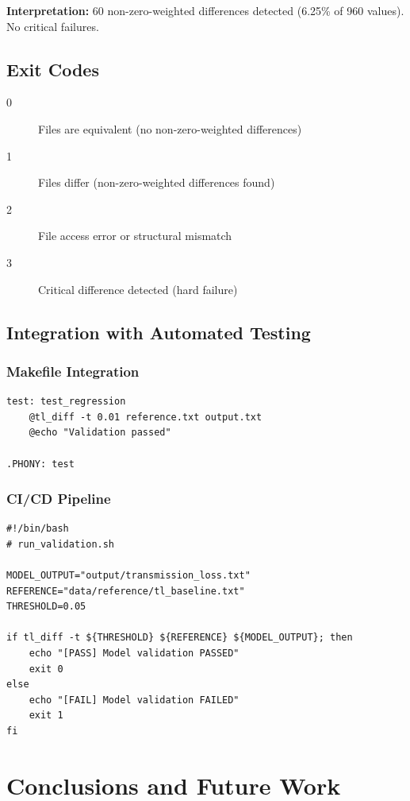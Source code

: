 \documentclass[11pt,letterpaper]{article}
\begin{document}
\textbf{Interpretation:} 60 non-zero-weighted differences detected (6.25\% of 960 values). No critical failures.

\subsection{Exit Codes}

\begin{description}
    \item[0] Files are equivalent (no non-zero-weighted differences)
    \item[1] Files differ (non-zero-weighted differences found)
    \item[2] File access error or structural mismatch
    \item[3] Critical difference detected (hard failure)
\end{description}

\subsection{Integration with Automated Testing}

\subsubsection{Makefile Integration}

\begin{verbatim}
test: test_regression
    @tl_diff -t 0.01 reference.txt output.txt
    @echo "Validation passed"

.PHONY: test
\end{verbatim}

\subsubsection{CI/CD Pipeline}

\begin{verbatim}
#!/bin/bash
# run_validation.sh

MODEL_OUTPUT="output/transmission_loss.txt"
REFERENCE="data/reference/tl_baseline.txt"
THRESHOLD=0.05

if tl_diff -t ${THRESHOLD} ${REFERENCE} ${MODEL_OUTPUT}; then
    echo "[PASS] Model validation PASSED"
    exit 0
else
    echo "[FAIL] Model validation FAILED"
    exit 1
fi
\end{verbatim}

\section{Conclusions and Future Work}
\label{sec:conclusion}
\end{document}

